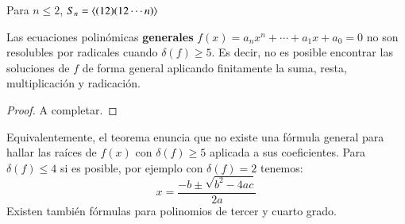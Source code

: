 \begin{lm}\label{lm:5.4}
    Para $n \leq 2$, $S_n = \langle(12)(12\cdots n)\rangle$
\end{lm}

\begin{thm}
    Las ecuaciones polinómicas \textbf{generales} $f(x) = a_n x^n + \cdots + a_1 x + a_0 = 0$ no son resolubles por radicales cuando $\delta(f)\geq 5$. Es decir, no es posible encontrar las soluciones de $f$ de forma general aplicando finitamente la suma, resta, multiplicación y radicación.
\end{thm}

\begin{proof}
    A completar.
\end{proof}

\begin{obs}
    Equivalentemente, el teorema enuncia que no existe una fórmula general para hallar las raíces de $f(x)$ con $\delta(f) \geq 5$ aplicada a sus coeficientes. Para $\delta(f) \leq 4$ si es posible, por ejemplo con $\delta(f) = 2$ tenemos:
    $$
        x = \frac{-b \pm \sqrt{b^2-4ac}}{2a}
    $$
    Existen también fórmulas para polinomios de tercer y cuarto grado.
\end{obs}
